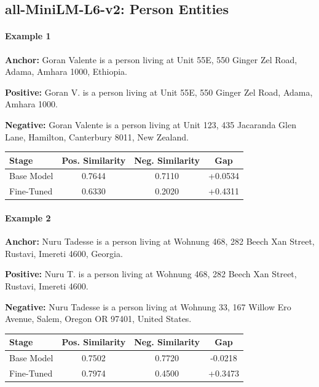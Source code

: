 \documentclass{article}
\begin{document}
\subsection{all-MiniLM-L6-v2: Person Entities}

\paragraph{Example 1}

\textbf{Anchor:} Goran Valente is a person living at Unit 55E, 550 Ginger Zel Road, Adama, Amhara 1000, Ethiopia.

\textbf{Positive:} Goran V. is a person living at Unit 55E, 550 Ginger Zel Road, Adama, Amhara 1000.

\textbf{Negative:} Goran Valente is a person living at Unit 123, 435 Jacaranda Glen Lane, Hamilton, Canterbury 8011, New Zealand.

\begin{center}
\small
\begin{tabular}{lccc}
\toprule
Stage & Pos. Similarity & Neg. Similarity & Gap \\
\midrule
Base Model & 0.7644 & 0.7110 & +0.0534 \\
Fine-Tuned & 0.6330 & 0.2020 & +0.4311 \\
\bottomrule
\end{tabular}
\end{center}

\paragraph{Example 2}

\textbf{Anchor:} Nuru Tadesse is a person living at Wohnung 468, 282 Beech Xan Street, Rustavi, Imereti 4600, Georgia.

\textbf{Positive:} Nuru T. is a person living at Wohnung 468, 282 Beech Xan Street, Rustavi, Imereti 4600.

\textbf{Negative:} Nuru Tadesse is a person living at Wohnung 33, 167 Willow Ero Avenue, Salem, Oregon OR 97401, United States.

\begin{center}
\small
\begin{tabular}{lccc}
\toprule
Stage & Pos. Similarity & Neg. Similarity & Gap \\
\midrule
Base Model & 0.7502 & 0.7720 & -0.0218 \\
Fine-Tuned & 0.7974 & 0.4500 & +0.3473 \\
\bottomrule
\end{tabular}
\end{center}
\end{document}
